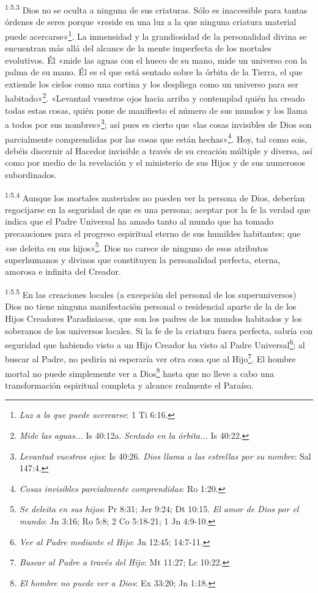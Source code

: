 \par
\textsuperscript{1:5.3} Dios no se oculta a ninguna de sus criaturas. Sólo es inaccesible para tantas órdenes de seres porque «reside en una luz a la que ninguna criatura material puede acercarse»\footnote{\textit{Luz a la que puede acercarse}: 1 Ti 6:16.}. La inmensidad y la grandiosidad de la personalidad divina se encuentran más allá del alcance de la mente imperfecta de los mortales evolutivos. Él «mide las aguas con el hueco de su mano, mide un universo con la palma de su mano. Él es el que está sentado sobre la órbita de la Tierra, el que extiende los cielos como una cortina y los despliega como un universo para ser habitado»\footnote{\textit{Mide las aguas...} Is 40:12a. \textit{Sentado en la órbita...} Is 40:22.}. «Levantad vuestros ojos hacia arriba y contemplad quién ha creado todas estas cosas, quién pone de manifiesto el número de sus mundos y los llama a todos por sus nombres»\footnote{\textit{Levantad vuestros ojos}: Is 40:26. \textit{Dios llama a las estrellas por su nombre}: Sal 147:4.}; así pues es cierto que «las cosas invisibles de Dios son parcialmente comprendidas por las cosas que están hechas»\footnote{\textit{Cosas invisibles parcialmente comprendidas}: Ro 1:20.}. Hoy, tal como sois, debéis discernir al Hacedor invisible a través de su creación múltiple y diversa, así como por medio de la revelación y el ministerio de sus Hijos y de sus numerosos subordinados.

\par
\textsuperscript{1:5.4} Aunque los mortales materiales no pueden ver la persona de Dios, deberían regocijarse en la seguridad de que es una persona; aceptar por la fe la verdad que indica que el Padre Universal ha amado tanto al mundo que ha tomado precauciones para el progreso espiritual eterno de sus humildes habitantes; que «se deleita en sus hijos»\footnote{\textit{Se deleita en sus hijos}: Pr 8:31; Jer 9:24; Dt 10:15. \textit{El amor de Dios por el mundo}: Jn 3:16; Ro 5:8; 2 Co 5:18-21; 1 Jn 4:9-10.}. Dios no carece de ninguno de esos atributos superhumanos y divinos que constituyen la personalidad perfecta, eterna, amorosa e infinita del Creador.

\par
\textsuperscript{1:5.5} En las creaciones locales (a excepción del personal de los superuniversos) Dios no tiene ninguna manifestación personal o residencial aparte de la de los Hijos Creadores Paradisiacos, que son los padres de los mundos habitados y los soberanos de los universos locales. Si la fe de la criatura fuera perfecta, sabría con seguridad que habiendo visto a un Hijo Creador ha visto al Padre Universal\footnote{\textit{Ver al Padre mediante el Hijo}: Jn 12:45; 14:7-11.}; al buscar al Padre, no pediría ni esperaría ver otra cosa que al Hijo\footnote{\textit{Buscar al Padre a través del Hijo}: Mt 11:27; Lc 10:22.}. El hombre mortal no puede simplemente ver a Dios\footnote{\textit{El hombre no puede ver a Dios}: Ex 33:20; Jn 1:18.} hasta que no lleve a cabo una transformación espiritual completa y alcance realmente el Paraíso.


